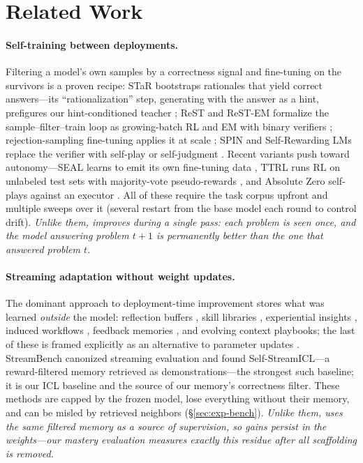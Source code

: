 \section{Related Work}
\label{sec:related}

\paragraph{Self-training between deployments.}
Filtering a model's own samples by a correctness signal and fine-tuning on the
survivors is a proven recipe: STaR bootstraps rationales that yield correct
answers---its ``rationalization'' step, generating with the answer as a hint,
prefigures our hint-conditioned teacher \citep{zelikman2022star}; ReST and
ReST-EM formalize the sample--filter--train loop as growing-batch RL and EM with
binary verifiers \citep{gulcehre2023rest, singh2024beyond}; rejection-sampling
fine-tuning applies it at scale \citep{yuan2023scaling}; SPIN and Self-Rewarding
LMs replace the verifier with self-play or self-judgment \citep{chen2024spin,
yuan2024selfrewarding}. Recent variants push toward autonomy---SEAL learns to
emit its own fine-tuning data \citep{zweiger2025seal}, TTRL runs RL on unlabeled
test sets with majority-vote pseudo-rewards \citep{zuo2025ttrl}, and Absolute
Zero self-plays against an executor \citep{zhao2025absolute}. All of these
require the task corpus upfront and multiple sweeps over it (several restart
from the base model each round to control drift). \emph{Unlike them, \method{}
improves during a single pass: each problem is seen once, and the model
answering problem $t{+}1$ is permanently better than the one that answered
problem $t$.}

\paragraph{Streaming adaptation without weight updates.}
The dominant approach to deployment-time improvement stores what was learned
\emph{outside} the model: reflection buffers \citep{shinn2023reflexion}, skill
libraries \citep{wang2024voyager}, experiential insights \citep{zhao2024expel},
induced workflows \citep{wang2025agent}, feedback memories
\citep{madaan2022memprompt}, and evolving context playbooks; the last of these is framed explicitly as an alternative to parameter
updates \citep{zhang2025agentic}.
StreamBench \citep{wu2024streambench} canonized streaming evaluation and found
Self-StreamICL---a reward-filtered memory retrieved as demonstrations---the
strongest such baseline; it is our ICL baseline and the source of our memory's
correctness filter. These methods are capped by the frozen model, lose
everything without their memory, and can be misled by retrieved neighbors
(\S\ref{sec:exp-bench}). \emph{Unlike them, \method{} uses the same filtered
memory as a source of supervision, so gains persist in the weights---our
mastery evaluation measures exactly this residue after all scaffolding is
removed.}

